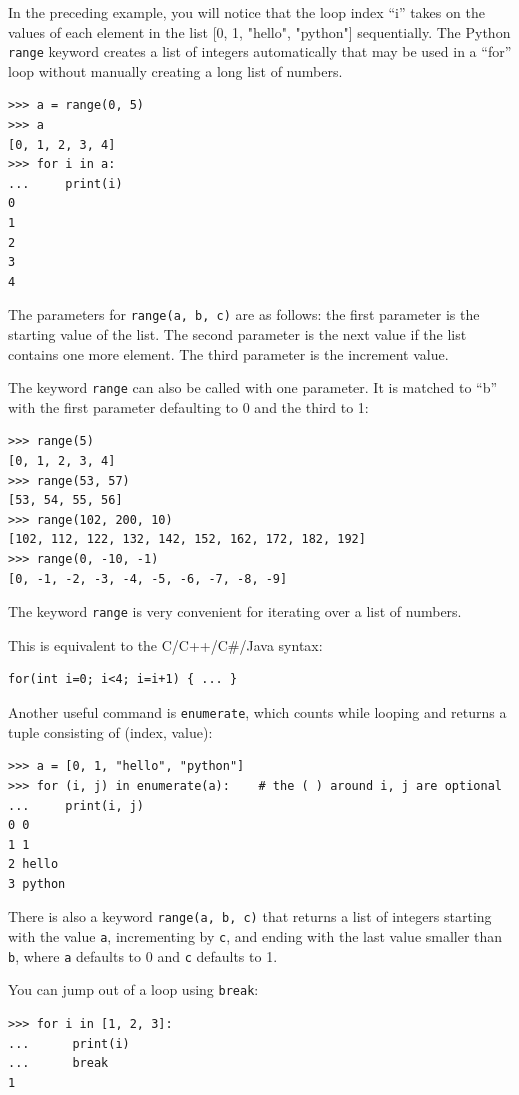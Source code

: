 \documentclass[justified, sixbynine]{tufte-book}
\def\ft{\small\tt}
\theoremstyle{plain}%
\newtheorem * {corollary}{Corollary}
\theoremstyle{definition}
\theoremstyle{remark}
\newtheorem * {remark}{Remark}
\newtheorem * {note}{Note}
\begin{document}
\begin{fullwidth}
In the preceding example, you will notice that the loop index ``i'' takes on the values of each element in the list [0, 1, "hello", "python"] sequentially.  The Python {\ft range} keyword creates a list of integers automatically that may be used in a ``for'' loop without manually creating a long list of numbers.

\begin{lstlisting}
>>> a = range(0, 5)
>>> a
[0, 1, 2, 3, 4]
>>> for i in a:
...     print(i)
0
1
2
3
4
\end{lstlisting}

The parameters for {\ft range(a, b, c)} are as follows: the first parameter is the starting value of the list.  The second parameter is the next value if the list contains one more element.  The third parameter is the increment value.

The keyword {\ft range} can also be called with one parameter. It is matched to ``b'' with the first parameter defaulting to 0 and the third to 1:

\begin{lstlisting}
>>> range(5)
[0, 1, 2, 3, 4]
>>> range(53, 57)
[53, 54, 55, 56]
>>> range(102, 200, 10)
[102, 112, 122, 132, 142, 152, 162, 172, 182, 192]
>>> range(0, -10, -1)
[0, -1, -2, -3, -4, -5, -6, -7, -8, -9]
\end{lstlisting}

The keyword {\ft range} is very convenient for iterating over a list of numbers.

This is equivalent to the C/C++/C\#/Java syntax:

\begin{lstlisting}
for(int i=0; i<4; i=i+1) { ... }
\end{lstlisting}

Another useful command is {\ft enumerate}, which counts while looping and returns a tuple consisting of (index, value):
\begin{lstlisting}
>>> a = [0, 1, "hello", "python"]
>>> for (i, j) in enumerate(a):    # the ( ) around i, j are optional
...     print(i, j)
0 0
1 1
2 hello
3 python
\end{lstlisting}

There is also a keyword {\ft range(a, b, c)} that returns a list of integers starting with the value {\ft a}, incrementing by {\ft c}, and ending with the last value smaller than {\ft b}, where {\ft a} defaults to 0 and {\ft c} defaults to 1.

You can jump out of a loop using {\ft break}:
\begin{lstlisting}
>>> for i in [1, 2, 3]:
...      print(i)
...      break
1
\end{lstlisting}


\end{fullwidth}
\end{document}

